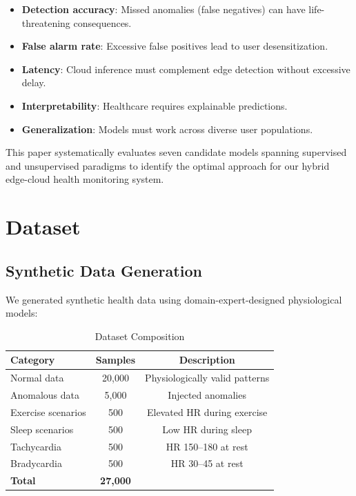 \documentclass[conference]{IEEEtran}
\begin{document}
\begin{itemize}
    \item \textbf{Detection accuracy}: Missed anomalies (false negatives) can have life-threatening consequences.
    \item \textbf{False alarm rate}: Excessive false positives lead to user desensitization.
    \item \textbf{Latency}: Cloud inference must complement edge detection without excessive delay.
    \item \textbf{Interpretability}: Healthcare requires explainable predictions.
    \item \textbf{Generalization}: Models must work across diverse user populations.
\end{itemize}

This paper systematically evaluates seven candidate models spanning supervised and unsupervised paradigms to identify the optimal approach for our hybrid edge-cloud health monitoring system.

\section{Dataset}

\subsection{Synthetic Data Generation}
We generated synthetic health data using domain-expert-designed physiological models:

\begin{table}[H]
\centering
\caption{Dataset Composition}
\label{tab:dataset}
\begin{tabular}{lcc}
\toprule
\textbf{Category} & \textbf{Samples} & \textbf{Description} \\
\midrule
Normal data & 20,000 & Physiologically valid patterns \\
Anomalous data & 5,000 & Injected anomalies \\
Exercise scenarios & 500 & Elevated HR during exercise \\
Sleep scenarios & 500 & Low HR during sleep \\
Tachycardia & 500 & HR 150--180 at rest \\
Bradycardia & 500 & HR 30--45 at rest \\
\midrule
\textbf{Total} & \textbf{27,000} & \\
\bottomrule
\end{tabular}
\end{table}
\end{document}
